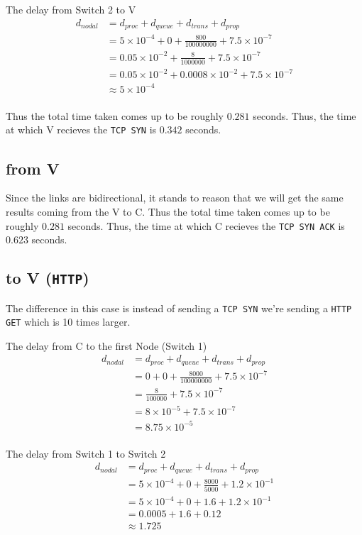 \documentclass{article}
\begin{document}
The delay from Switch 2 to V
\begin{align*}
    d_{nodal} &= d_{proc} + d_{queue} + d_{trans} + d_{prop} \\
    &= 5 \times 10^{-4} + 0 + \frac{800}{100000000} + 7.5 \times 10^{-7} \\
    &= 0.05 \times 10^{-2} + \frac{8}{1000000} + 7.5 \times 10^{-7} \\
    &= 0.05 \times 10^{-2} + 0.0008 \times 10^{-2} + 7.5 \times 10^{-7} \\
    &\approx 5 \times 10^{-4} \\
\end{align*}

Thus the total time taken comes up to be roughly $0.281$ seconds.
Thus, the time at which V recieves the \texttt{TCP SYN} is $0.342$ seconds.

\subsection{from V}
Since the links are bidirectional, it stands to reason that we will get the
same results coming from the V to C.
Thus the total time taken comes up to be roughly $0.281$ seconds.
Thus, the time at which C recieves the \texttt{TCP SYN ACK} is
$0.623$ seconds.

\subsection{to V (\texttt{HTTP})}
The difference in this case is instead of sending a \texttt{TCP SYN} we're
sending a \texttt{HTTP GET} which is 10 times larger.

The delay from C to the first Node (Switch 1)
\begin{align*}
    d_{nodal} &= d_{proc} + d_{queue} + d_{trans} + d_{prop} \\
    &= 0 + 0 + \frac{8000}{100000000} + 7.5 \times 10^{-7} \\
    &= \frac{8}{100000} + 7.5 \times 10^{-7} \\
    &= 8 \times 10^{-5} + 7.5 \times 10^{-7} \\
    &= 8.75 \times 10^{-5} \\
\end{align*}

The delay from Switch 1 to Switch 2
\begin{align*}
    d_{nodal} &= d_{proc} + d_{queue} + d_{trans} + d_{prop} \\
    &= 5 \times 10^{-4} + 0 + \frac{8000}{5000} + 1.2 \times 10^{-1} \\
    &= 5 \times 10^{-4} + 0 + 1.6 + 1.2 \times 10^{-1} \\
    &= 0.0005 + 1.6 + 0.12 \\
    &\approx 1.725 \\
\end{align*}
\end{document}

